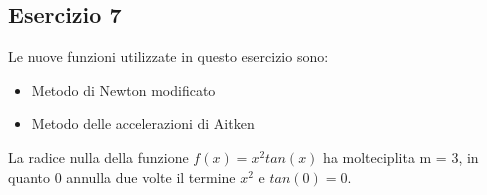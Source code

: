 \subsection{Esercizio 7}
Le nuove funzioni utilizzate in  questo esercizio sono:
\begin{itemize}
    \item Metodo di Newton modificato
    
    \item Metodo delle accelerazioni di Aitken
    
\end{itemize}
La radice nulla della funzione $f(x)=x^2tan(x)$ ha molteciplita m = 3, in quanto $0$ annulla due volte il termine
$x^2$ e $tan(0) = 0$. 